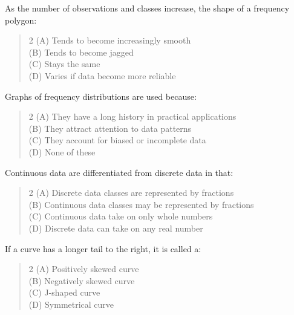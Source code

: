 \documentclass[11pt,a4paper]{article}
\begin{document}
\begin{mcqlist}
\item As the number of observations and classes increase, the shape of a frequency polygon:
\begin{quote}\begin{multicols}{2}
\noindent (A) Tends to become increasingly smooth \\
(B) Tends to become jagged \\
(C) Stays the same \\
(D) Varies if data become more reliable
\end{multicols}\end{quote}

\item Graphs of frequency distributions are used because:
\begin{quote}\begin{multicols}{2}
\noindent (A) They have a long history in practical applications \\
(B) They attract attention to data patterns \\
(C) They account for biased or incomplete data \\
(D) None of these
\end{multicols}\end{quote}

\item Continuous data are differentiated from discrete data in that:
\begin{quote}\begin{multicols}{2}
\noindent (A) Discrete data classes are represented by fractions \\
(B) Continuous data classes may be represented by fractions \\
(C) Continuous data take on only whole numbers \\
(D) Discrete data can take on any real number
\end{multicols}\end{quote}

\item If a curve has a longer tail to the right, it is called a:
\begin{quote}\begin{multicols}{2}
\noindent (A) Positively skewed curve \\
(B) Negatively skewed curve \\
(C) J-shaped curve \\
(D) Symmetrical curve
\end{multicols}\end{quote}


\end{mcqlist}
\end{document}
